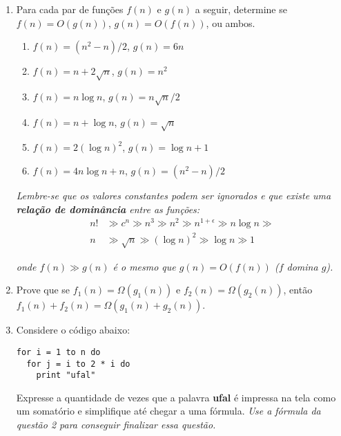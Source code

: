 \documentclass[a4paper,10pt]{article}
\begin{document}
\begin{multicols*}{2}
\begin{enumerate}
  \item Para cada par de funções $f(n)$ e $g(n)$ a seguir, determine se $f(n) = O(g(n))$, $g(n) = O(f(n))$, ou ambos.

    \begin{enumerate}
      \item $f(n) = (n^2 - n)/2$, $g(n) = 6n $
      \item $f(n) = n + 2\sqrt{n}$, $g(n) = n^2 $
      \item $f(n) = n\log{n}$, $g(n) = n\sqrt{n}/2 $
      \item $f(n) = n + \log{n}$, $g(n) = \sqrt{n}$
      \item $f(n) = 2(\log{n})^2$, $g(n) = \log{n} + 1$
      \item $f(n) = 4n\log{n} + n$, $g(n) = (n^2 - n)/2$
    \end{enumerate}

    \textit{Lembre-se que os valores constantes podem ser ignorados e que existe uma \textbf{relação de dominância} entre as funções:}
    \begin{align*}
      n! & \gg c^n \gg n^3 \gg n^2 \gg n^{1 + \epsilon} \gg n \log{n} \gg \\
      n & \gg \sqrt{n} \gg (\log{n})^2 \gg \log{n} \gg 1
    \end{align*}

    \textit{onde $f(n) \gg g(n)$ é o mesmo que $g(n) = O(f(n))$ ($f$ domina $g$).}

  \item Prove que se $f_1(n) = \Omega(g_1(n))$ e $f_2(n) = \Omega(g_2(n))$, então $f_1(n) + f_2(n) = \Omega(g_1(n) + g_2(n))$.

  \vfill\null
  \columnbreak

  \item Considere o código abaixo:

    \begin{verbatim}
for i = 1 to n do
  for j = i to 2 * i do
    print "ufal"
    \end{verbatim}

  Expresse a quantidade de vezes que a palavra \textbf{ufal} é impressa na tela como um somatório e simplifique até chegar a uma fórmula. \textit{Use a fórmula da questão 2 para conseguir finalizar essa questão.}


\end{enumerate}
\end{multicols*}
\end{document}
